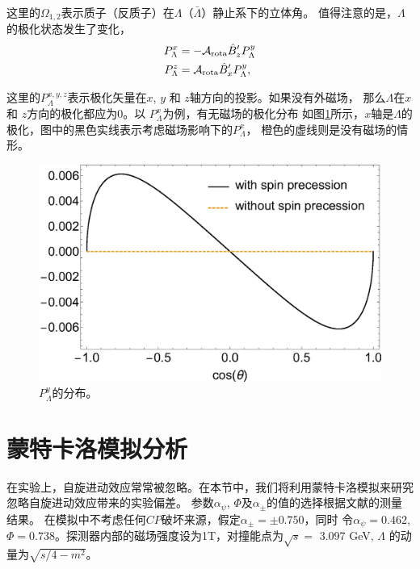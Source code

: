 这里的$\Omega_{1,2}$表示质子（反质子）在$\Lambda$（$\bar{\Lambda}$）静止系下的立体角。
值得注意的是，$\Lambda$的极化状态发生了变化，
\begin{equation}
    \begin{aligned}
        P_{\Lambda}^{x} & = - \mathcal{A}_{\rm rota} \hat{B}'_{z} P_{\Lambda}^{y} \\
        P_{\Lambda}^{z} & =  \mathcal{A}_{\rm rota} \hat{B}'_{x}
        P_{\Lambda}^{y},  
    \end{aligned}
\end{equation}

这里的$P_{\Lambda}^{x,y,z}$表示极化矢量在$x$, $y$ 和 $z$轴方向的投影。如果没有外磁场，
那么$\Lambda$在$x$和 $z$方向的极化都应为0。以 $P_{\Lambda}^{x}$为例，有无磁场的极化分布
如图\ref{fig:px}所示，$x$轴是$\Lambda$的极化，图中的黑色实线表示考虑磁场影响下的$P_{\Lambda}^{x}$，
橙色的虚线则是没有磁场的情形。
\begin{figure}[!h]
    \centering
    \vspace{1cm}
    \includegraphics[width=0.9\linewidth]{figures/spin/px.eps}
    \caption{%
        $P_{\Lambda}^{y}$的分布。
    }%
    \label{fig:px}
\end{figure}
\section{蒙特卡洛模拟分析}
在实验上，自旋进动效应常常被忽略。在本节中，我们将利用蒙特卡洛模拟来研究忽略自旋进动效应带来的实验偏差。
参数$\alpha_{\psi}$, $\Phi$及$\alpha_{\pm}$的值的选择根据文献\cite{Ablikim:2018zay}的测量结果。
在模拟中不考虑任何$CP$破坏来源，假定$\alpha_{\pm}=\pm0.750$，同时
令$\alpha_{\psi}=0.462$, $\Phi=0.738$。探测器内部的磁场强度设为1T，对撞能点为$\sqrt{s} = $ 3.097 GeV, $\Lambda$
的动量为$\sqrt{s/4 - m^2}$。

